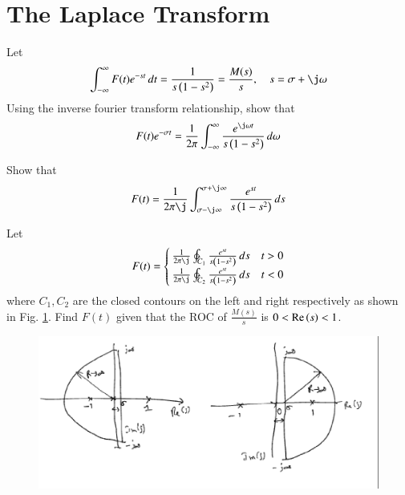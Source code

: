 \documentclass[journal,12pt,twocolumn]{IEEEtran}
\begin{document}
\section{The Laplace Transform}
\begin{problem}
Let
\begin{equation}
\int_{-\infty}^{\infty}F(t)e^{-st}\,dt = \frac{1}{s\brak{1-s^2}} = \frac{M(s)}{s}, \quad s = \sigma + \j \omega
\end{equation}
Using the inverse fourier transform relationship, show that
\begin{equation}
\label{eq:laplace_key}
F(t)e^{-\sigma t} = \frac{1}{2\pi}\int_{-\infty}^{\infty}\frac{e^{\j\omega t}}{s\brak{1-s^2}}\,d\omega
\end{equation}
\end{problem}
%
\begin{problem}
Show that
\begin{equation}
F(t) = \frac{1}{2\pi \j}\int_{\sigma - \j \infty}^{\sigma + \j \infty}\frac{e^{s t}}{s\brak{1-s^2}}\,ds
\end{equation}
\end{problem}
\begin{problem}
Let
\begin{align}
F(t) = 
\begin{cases}
\frac{1}{2\pi \j}\ointctrclockwise_{C_1}\frac{e^{st}}{s\brak{1-s^2}}\,ds & t > 0
\\
\frac{1}{2\pi \j}\ointctrclockwise_{C_2}\frac{e^{st}}{s\brak{1-s^2}}\,ds & t < 0
\end{cases}
\end{align}
where $C_1, C_2$ are the closed contours on the left and right respectively as shown in Fig. \ref{fig:laplace}. Find $F(t)$
given that the ROC of $\frac{M(s)}{s}$ is $0 < \text{Re}\left(s\right) < 1$.
\end{problem}
\begin{figure}[!h]
\centering
\includegraphics[width=\columnwidth]{./figs/laplace.eps}
\caption{}
\label{fig:laplace}
\end{figure}
%
\end{document}
